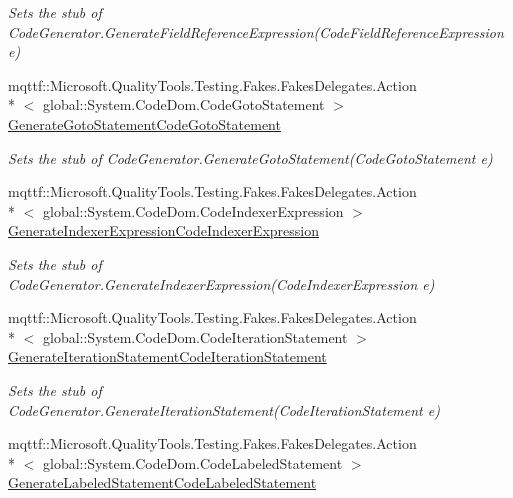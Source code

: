\begin{DoxyCompactItemize}
\begin{DoxyCompactList}\small\item\em Sets the stub of Code\-Generator.\-Generate\-Field\-Reference\-Expression(\-Code\-Field\-Reference\-Expression e)\end{DoxyCompactList}\item 
mqttf\-::\-Microsoft.\-Quality\-Tools.\-Testing.\-Fakes.\-Fakes\-Delegates.\-Action\\*
$<$ global\-::\-System.\-Code\-Dom.\-Code\-Goto\-Statement $>$ \hyperlink{class_system_1_1_code_dom_1_1_compiler_1_1_fakes_1_1_stub_code_generator_af3372bdb2bc10fcd0ae1076cf26e9e7a}{Generate\-Goto\-Statement\-Code\-Goto\-Statement}
\begin{DoxyCompactList}\small\item\em Sets the stub of Code\-Generator.\-Generate\-Goto\-Statement(\-Code\-Goto\-Statement e)\end{DoxyCompactList}\item 
mqttf\-::\-Microsoft.\-Quality\-Tools.\-Testing.\-Fakes.\-Fakes\-Delegates.\-Action\\*
$<$ global\-::\-System.\-Code\-Dom.\-Code\-Indexer\-Expression $>$ \hyperlink{class_system_1_1_code_dom_1_1_compiler_1_1_fakes_1_1_stub_code_generator_a8708103c7a77312901bba80d3c82098f}{Generate\-Indexer\-Expression\-Code\-Indexer\-Expression}
\begin{DoxyCompactList}\small\item\em Sets the stub of Code\-Generator.\-Generate\-Indexer\-Expression(\-Code\-Indexer\-Expression e)\end{DoxyCompactList}\item 
mqttf\-::\-Microsoft.\-Quality\-Tools.\-Testing.\-Fakes.\-Fakes\-Delegates.\-Action\\*
$<$ global\-::\-System.\-Code\-Dom.\-Code\-Iteration\-Statement $>$ \hyperlink{class_system_1_1_code_dom_1_1_compiler_1_1_fakes_1_1_stub_code_generator_a0bcd2fe4945af80bc36d91ebf6df3452}{Generate\-Iteration\-Statement\-Code\-Iteration\-Statement}
\begin{DoxyCompactList}\small\item\em Sets the stub of Code\-Generator.\-Generate\-Iteration\-Statement(\-Code\-Iteration\-Statement e)\end{DoxyCompactList}\item 
mqttf\-::\-Microsoft.\-Quality\-Tools.\-Testing.\-Fakes.\-Fakes\-Delegates.\-Action\\*
$<$ global\-::\-System.\-Code\-Dom.\-Code\-Labeled\-Statement $>$ \hyperlink{class_system_1_1_code_dom_1_1_compiler_1_1_fakes_1_1_stub_code_generator_a8ae72ca462bebf551b43b7b838a266e2}{Generate\-Labeled\-Statement\-Code\-Labeled\-Statement}

\end{DoxyCompactItemize}

